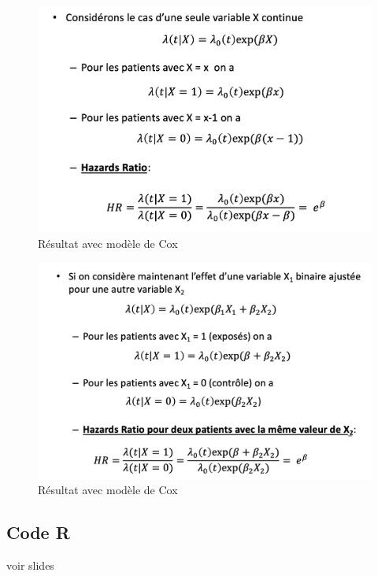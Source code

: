 \begin{figure}[H]
    \centering
    \includegraphics[scale=0.5]{images/cox_2.png}
    \caption{Résultat avec modèle de Cox}
    \label{fig:my_label}
\end{figure}

\begin{figure}[H]
    \centering
    \includegraphics[scale=0.5]{images/cox_3.png}
    \caption{Résultat avec modèle de Cox}
    \label{fig:my_label}
\end{figure}

\subsection{Code R}
voir slides

